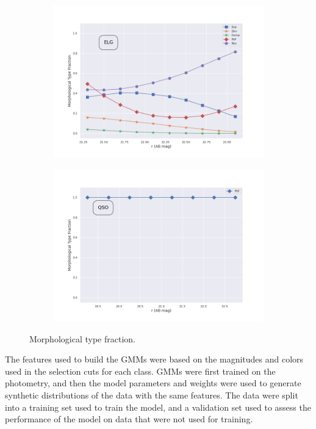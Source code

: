 \begin{figure}
\begin{subfigure}{.5\textwidth}
\caption{}
\end{subfigure}
\hfill
\begin{subfigure}{.5\textwidth}
\centering
\includegraphics[width=1\linewidth]{images/gmm/elg_morph.png}
\caption{}
\end{subfigure}
\begin{subfigure}{.5\textwidth}
\centering
\includegraphics[width=1\linewidth]{images/gmm/qso_morph.png}
\caption{}
\end{subfigure}
\label{fig:morphfrac}
\caption{Morphological type fraction.}
\end{figure}

The features used to build the GMMs were based on the magnitudes and colors used in the selection cuts for each class. GMMs were first trained on the photometry, and then the model parameters and weights were used to generate synthetic distributions of the data with the same features. The data were split into a training set used to train the model, and a validation set used to assess the performance of the model on data that were not used for training. 


